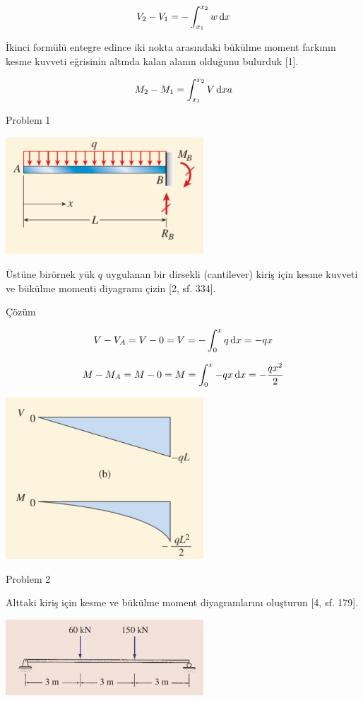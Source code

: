 \documentclass[12pt,fleqn]{article}\usepackage{../../common}
\begin{document}
$$
V_2 - V_1 = - \int_{x_1}^{x_2} w \,\mathrm{d} x
$$

İkinci formülü entegre edince iki nokta arasındaki bükülme moment farkının kesme
kuvveti eğrisinin altında kalan alanın olduğunu bulurduk [1].

$$
M_2 - M_1 = \int_{x_1}^{x_2} V \,\mathrm{d} xa
$$

Problem 1

\includegraphics[width=20em]{phy_020_strs_02_11.jpg}

Üstüne birörnek yük $q$ uygulanan bir dirsekli (cantilever) kiriş için kesme
kuvveti ve bükülme momenti diyagramı çizin [2, sf. 334].

Çözüm

$$
V - V_A = V - 0 = V = -\int_{0}^{x} q \,\mathrm{d} x = -qx
$$

$$
M - M_A = M - 0 = M = \int_{0}^{x} -qx \,\mathrm{d} x = -\frac{qx^2}{2}
$$

\includegraphics[width=20em]{phy_020_strs_02_12.jpg}

Problem 2

Alttaki kiriş için kesme ve bükülme moment diyagramlarını oluşturun [4, sf. 179].

\includegraphics[width=20em]{phy_020_strs_02_13.jpg}
\end{document}
